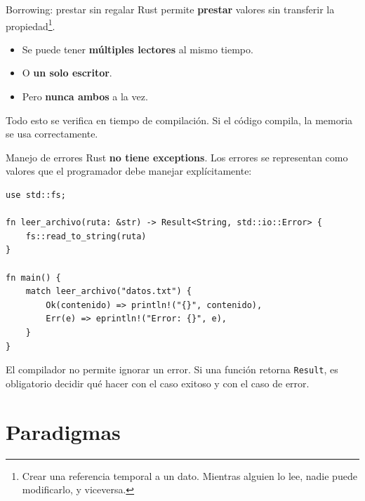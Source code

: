 \documentclass[11pt, aspectratio=169]{beamer}
\begin{document}
	\begin{frame}{Borrowing: prestar sin regalar}
		Rust permite \textbf{prestar} valores sin transferir la propiedad\footnote{Crear una referencia temporal a un dato. Mientras alguien lo lee, nadie puede modificarlo, y viceversa.}.
		
		\vspace{0.4cm}

		\begin{itemize}
			\item Se puede tener \textbf{múltiples lectores} al mismo tiempo.
			\item O \textbf{un solo escritor}.
			\item Pero \textbf{nunca ambos} a la vez.
		\end{itemize}
		
		\vspace{0.3cm}
		Todo esto se verifica en tiempo de compilación. Si el código compila, la memoria se usa correctamente.
	\end{frame}

	\begin{frame}[fragile]{Manejo de errores}
		Rust \textbf{no tiene exceptions}. Los errores se representan como valores que el programador debe manejar explícitamente:
		\begin{lstlisting}[style=rust]
use std::fs;

fn leer_archivo(ruta: &str) -> Result<String, std::io::Error> {
    fs::read_to_string(ruta)
}

fn main() {
    match leer_archivo("datos.txt") {
        Ok(contenido) => println!("{}", contenido),
        Err(e) => eprintln!("Error: {}", e),
    }
}
		\end{lstlisting}
		
		El compilador no permite ignorar un error. Si una función retorna \texttt{Result}, es obligatorio decidir qué hacer con el caso exitoso y con el caso de error.
	\end{frame}


	\section{Paradigmas}
\end{document}
